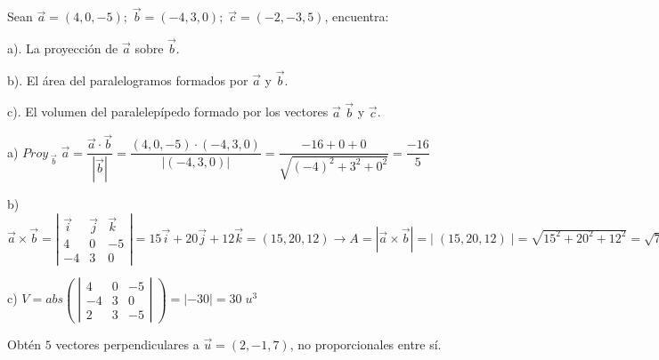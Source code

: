 \begin{proofw}\renewcommand{\qedsymbol}{$\diamond$}
	
\end{proofw}

\begin{ejre}
	Sean $\vec a=(4,0,-5); \; \vec b=(-4,3,0);\; \vec c=(-2,-3,5)$, encuentra:
	
	a). La proyección de $\vec a$ sobre $\vec b$.
	
	b). El área del paralelogramos formados por $\vec a$ y $\vec b$.
	
	c). El volumen del paralelepípedo formado por los vectores  $\vec a$ $\vec b$ y $\vec c$.		
	
\end{ejre}

\begin{proofw}\renewcommand{\qedsymbol}{$\diamond$}
a) $Proy_{\;\vec b} \; \vec a= \dfrac {\vec a \cdot \vec b}{|\vec b|}= \dfrac {(4,0,-5)\cdot (-4,3,0)}{|(-4,3,0)|}=\dfrac {-16+0+0}{\sqrt{(-4)^2+3^2+0^2}}=\dfrac {-16}{5}$

\noindent b) $\vec a \times \vec b= \left| \begin{matrix} \vec i & \vec j & \vec k \\4&0&-5\\-4&3&0 \end{matrix} \right|= 15\vec i + 20 \vec j + 12 \vec k =(15,20,12) \to A=|\vec a \times \vec b|=|\;(15,20,12)\;|=\sqrt{15^2+20^2+12^2} =\sqrt{769}\simeq 27.73\; u^2$

\noindent c) $V=abs \left(\;
\left| \begin{matrix} 4&0&-5\\-4&3&0 \\ 2&3&-5 \end{matrix} \right|
\; \right)
=|-30|=30\; u^3$
\end{proofw}

\begin{ejre} Obtén $5$ vectores perpendiculares a $\vec u=(2,-1,7)$, no proporcionales entre sí.
\end{ejre}

